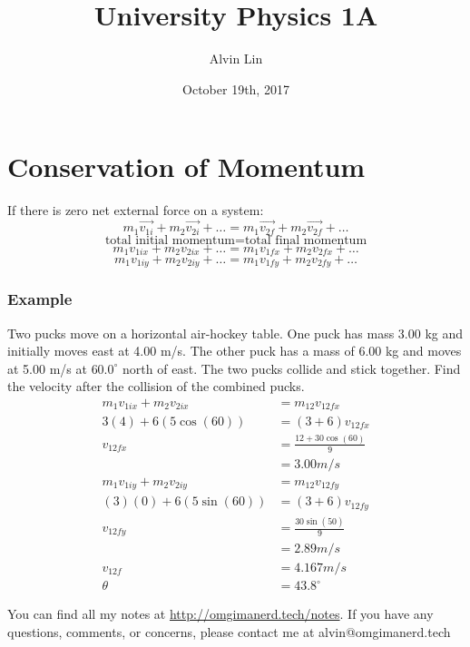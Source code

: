 \documentclass[letterpaper, 12pt]{math}
\title{University Physics 1A}
\author{Alvin Lin}
\date{October 19th, 2017}
\begin{document}
\maketitle

\section*{Conservation of Momentum}
If there is zero net external force on a system:
\[ m_1\overrightarrow{v_{1i}}+m_2\overrightarrow{v_{2i}}+\dots =
  m_1\overrightarrow{v_{2f}}+m_2\overrightarrow{v_{2f}}+\dots \]
\[ \text{total initial momentum} = \text{total final momentum} \]
\[ m_1v_{1ix}+m_2v_{2ix}+\dots = m_1v_{1fx}+m_2v_{2fx}+\dots \]
\[ m_1v_{1iy}+m_2v_{2iy}+\dots = m_1v_{1fy}+m_2v_{2fy}+\dots \]

\subsubsection*{Example}
Two pucks move on a horizontal air-hockey table. One puck has mass 3.00 kg and
initially moves east at 4.00 m/s. The other puck has a mass of 6.00 kg and
moves at 5.00 m/s at \( 60.0^{\circ} \) north of east. The two pucks collide and
stick together. Find the velocity after the collision of the combined pucks.
\begin{align*}
  m_1v_{1ix}+m_2v_{2ix} &= m_{12}v_{12fx} \\
  3(4)+6(5\cos(60)) &= (3+6)v_{12fx} \\
  v_{12fx} &= \frac{12+30\cos(60)}{9} \\
  &= 3.00m/s \\
  m_1v_{1iy}+m_2v_{2iy} &= m_{12}v_{12fy} \\
  (3)(0)+6(5\sin(60)) &= (3+6)v_{12fy} \\
  v_{12fy} &= \frac{30\sin(50)}{9} \\
  &= 2.89m/s \\
  v_{12f} &= 4.167m/s \\
  \theta &= 43.8^{\circ}
\end{align*}

\begin{center}
  You can find all my notes at \url{http://omgimanerd.tech/notes}. If you have
  any questions, comments, or concerns, please contact me at
  alvin@omgimanerd.tech
\end{center}
\end{document}
